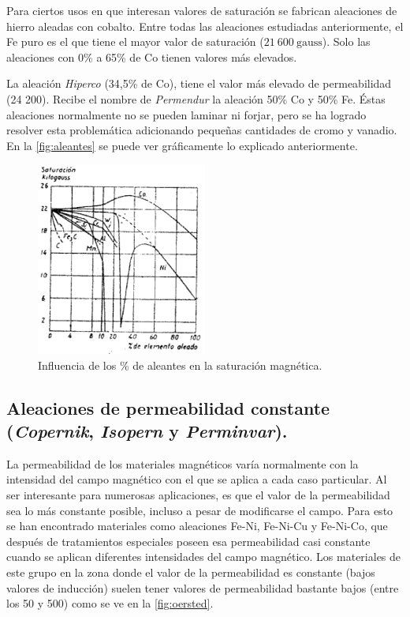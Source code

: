 \documentclass[12pt,a4paper]{article}
\begin{document}
Para ciertos usos en que interesan valores de saturación se fabrican aleaciones de hierro aleadas con cobalto. Entre todas las aleaciones estudiadas anteriormente, el Fe puro es el que tiene el mayor valor de saturación ($21\ 600\ \mathrm{gauss}$). Solo las aleaciones con 0\% a 65\% de Co tienen valores más elevados.

La aleación \textit{Hiperco} (34,5\% de Co), tiene el valor más elevado de permeabilidad (24 200). Recibe el nombre de \textit{Permendur} la aleación 50\% Co y 50\% Fe. Éstas aleaciones normalmente no se pueden laminar ni forjar, pero se ha logrado resolver esta problemática adicionando pequeñas cantidades de cromo y vanadio. En la \autoref{fig:aleantes} se puede ver gráficamente lo explicado anteriormente.

\begin{figure}[h!]    
    \centering         
    \includegraphics[width=0.5\textwidth]{IMAGENES LATEX/8.png}
    \caption{Influencia de los \% de aleantes en la saturación magnética.}
    \label{fig:aleantes}
\end{figure}

\subsection{Aleaciones de permeabilidad constante (\textit{Copernik}, \textit{Isopern} y \textit{Perminvar}).}

La permeabilidad de los materiales magnéticos varía normalmente con la intensidad del campo magnético con el que se aplica a cada caso particular. Al ser interesante para numerosas aplicaciones, es que el valor de la permeabilidad sea lo más constante posible, incluso a pesar de modificarse el campo. Para esto se han encontrado materiales como aleaciones Fe-Ni, Fe-Ni-Cu y Fe-Ni-Co, que después de tratamientos especiales poseen esa permeabilidad casi constante cuando se aplican diferentes intensidades del campo magnético. Los materiales de este grupo en la zona donde el valor de la permeabilidad es constante (bajos valores de inducción) suelen tener valores de permeabilidad bastante bajos (entre los 50 y 500) como se ve en la \autoref{fig:oersted}.
\end{document}
